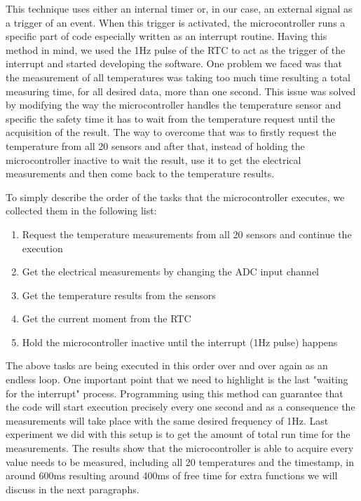 This technique uses either an internal timer or, in our case, an external signal as a trigger of an event. When this trigger is activated, the microcontroller runs a specific part of code especially written as an interrupt routine. Having this method in mind, we used the 1Hz pulse of the RTC to act as the trigger of the interrupt and started developing the software. One problem we faced was that the measurement of all temperatures was taking too much time resulting a total measuring time, for all desired data, more than one second. This issue was solved by modifying the way the microcontroller handles the temperature sensor and specific the safety time it has to wait from the temperature request until the acquisition of the result. The way to overcome that was to firstly request the temperature from all 20 sensors and after that, instead of holding the microcontroller inactive to wait the result, use it to get the electrical measurements and then come back to the temperature results.

To simply describe the order of the tasks that the microcontroller executes, we collected them in the following list:

\begin{enumerate}
    \item Request the temperature measurements from all 20 sensors and continue the execution
    \item Get the electrical measurements by changing the ADC input channel
    \item Get the temperature results from the sensors
    \item Get the current moment from the RTC
    \item Hold the microcontroller inactive until the interrupt (1Hz pulse) happens
\end{enumerate}

The above tasks are being executed in this order over and over again as an endless loop. One important point that we need to highlight is the last "waiting for the interrupt" process. Programming using this method can guarantee that the code will start execution precisely every one second and as a consequence the measurements will take place with the same desired frequency of 1Hz. Last experiment we did with this setup is to get the amount of total run time for the measurements. The results show that the microcontroller is able to acquire every value needs to be measured, including all 20 temperatures and the timestamp, in around 600ms resulting around 400ms of free time for extra functions we will discuss in the next paragraphs.


